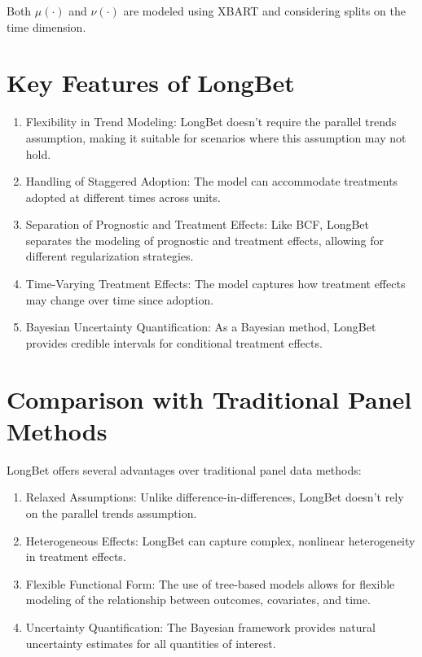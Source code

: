 \documentclass[
  letterpaper,
  DIV=11,
  numbers=noendperiod]{scrreprt}
\providecommand{\tightlist}{%
  \setlength{\itemsep}{0pt}\setlength{\parskip}{0pt}}\usepackage{longtable,booktabs,array}
\begin{document}
Both \(\mu(\cdot)\) and \(\nu(\cdot)\) are modeled using XBART and
considering splits on the time dimension.

\section{Key Features of LongBet}\label{key-features-of-longbet}

\begin{enumerate}
\def\labelenumi{\arabic{enumi}.}
\tightlist
\item
  Flexibility in Trend Modeling: LongBet doesn't require the parallel
  trends assumption, making it suitable for scenarios where this
  assumption may not hold.
\item
  Handling of Staggered Adoption: The model can accommodate treatments
  adopted at different times across units.
\item
  Separation of Prognostic and Treatment Effects: Like BCF, LongBet
  separates the modeling of prognostic and treatment effects, allowing
  for different regularization strategies.
\item
  Time-Varying Treatment Effects: The model captures how treatment
  effects may change over time since adoption.
\item
  Bayesian Uncertainty Quantification: As a Bayesian method, LongBet
  provides credible intervals for conditional treatment effects.
\end{enumerate}

\section{Comparison with Traditional Panel
Methods}\label{comparison-with-traditional-panel-methods}

LongBet offers several advantages over traditional panel data methods:

\begin{enumerate}
\def\labelenumi{\arabic{enumi}.}
\tightlist
\item
  Relaxed Assumptions: Unlike difference-in-differences, LongBet doesn't
  rely on the parallel trends assumption.
\item
  Heterogeneous Effects: LongBet can capture complex, nonlinear
  heterogeneity in treatment effects.
\item
  Flexible Functional Form: The use of tree-based models allows for
  flexible modeling of the relationship between outcomes, covariates,
  and time.
\item
  Uncertainty Quantification: The Bayesian framework provides natural
  uncertainty estimates for all quantities of interest.
\end{enumerate}
\end{document}
